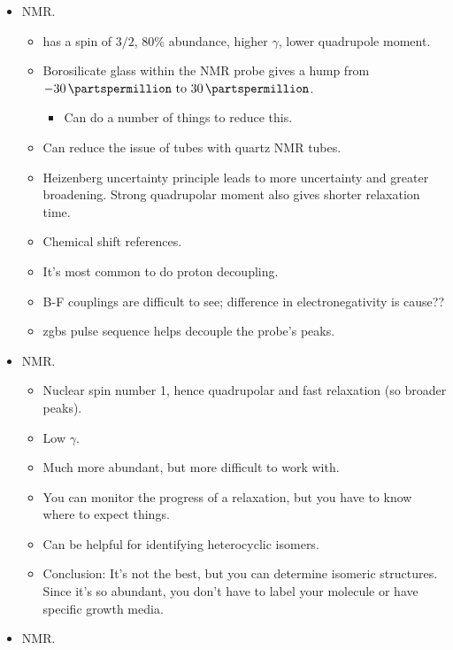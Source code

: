 \documentclass[../notes.tex]{subfiles}
\begin{document}
\begin{itemize}
    \begin{itemize}
        \item {} NMR.
        \begin{itemize}
            \item {} has a spin of $3/2$, 80\% abundance, higher $\gamma$, lower quadrupole moment.
            \item Borosilicate glass within the NMR probe gives a hump from $-\SIrange{30}{30}{\partspermillion}$.
            \begin{itemize}
                \item Can do a number of things to reduce this.
            \end{itemize}
            \item Can reduce the issue of tubes with quartz NMR tubes.
            \item Heizenberg uncertainty principle leads to more uncertainty and greater broadening. Strong quadrupolar moment also gives shorter relaxation time.
            \item Chemical shift references.
            \item It's most common to do proton decoupling.
            \item B-F couplings are difficult to see; difference in electronegativity is cause??
            \item zgbs pulse sequence helps decouple the probe's peaks.
        \end{itemize}
        \item {} NMR.
        \begin{itemize}
            \item Nuclear spin number 1, hence quadrupolar and fast relaxation (so broader peaks).
            \item Low $\gamma$.
            \item Much more abundant, but more difficult to work with.
            \item You can monitor the progress of a relaxation, but you have to know where to expect things.
            \item Can be helpful for identifying heterocyclic isomers.
            \item Conclusion: It's not the best, but you can determine isomeric structures. Since it's so abundant, you don't have to label your molecule or have specific growth media.
        \end{itemize}
        \item {} NMR.

\end{itemize}
\end{itemize}
\end{document}
